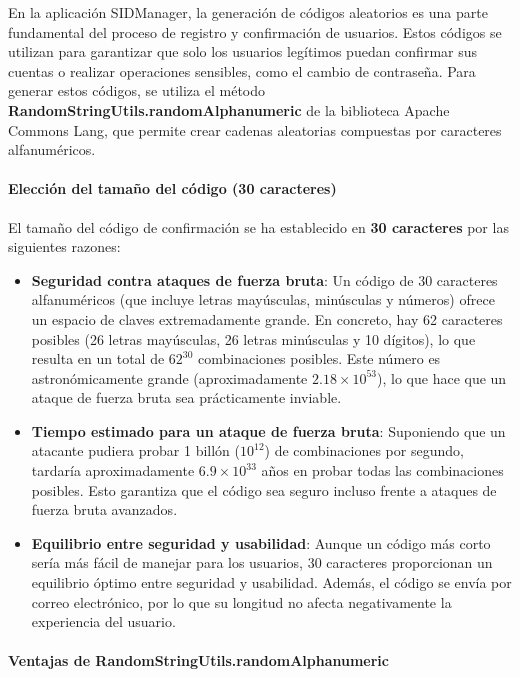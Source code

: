 \documentclass[draft]{scrbook}
\begin{document}
En la aplicación SIDManager, la generación de códigos aleatorios es una parte fundamental del proceso de registro y confirmación de usuarios. Estos códigos se utilizan para garantizar que solo los usuarios legítimos puedan confirmar sus cuentas o realizar operaciones sensibles, como el cambio de contraseña. Para generar estos códigos, se utiliza el método \textbf{RandomStringUtils.randomAlphanumeric} de la biblioteca Apache Commons Lang, que permite crear cadenas aleatorias compuestas por caracteres alfanuméricos.

\paragraph{Elección del tamaño del código (30 caracteres)}

El tamaño del código de confirmación se ha establecido en \textbf{30 caracteres} por las siguientes razones:

\begin{itemize}
    \item \textbf{Seguridad contra ataques de fuerza bruta}: Un código de 30 caracteres alfanuméricos (que incluye letras mayúsculas, minúsculas y números) ofrece un espacio de claves extremadamente grande. En concreto, hay 62 caracteres posibles (26 letras mayúsculas, 26 letras minúsculas y 10 dígitos), lo que resulta en un total de \(62^{30}\) combinaciones posibles. Este número es astronómicamente grande (aproximadamente \(2.18 \times 10^{53}\)), lo que hace que un ataque de fuerza bruta sea prácticamente inviable.
    
    \item \textbf{Tiempo estimado para un ataque de fuerza bruta}: Suponiendo que un atacante pudiera probar 1 billón (\(10^{12}\)) de combinaciones por segundo, tardaría aproximadamente \(6.9 \times 10^{33}\) años en probar todas las combinaciones posibles. Esto garantiza que el código sea seguro incluso frente a ataques de fuerza bruta avanzados.
    
    \item \textbf{Equilibrio entre seguridad y usabilidad}: Aunque un código más corto sería más fácil de manejar para los usuarios, 30 caracteres proporcionan un equilibrio óptimo entre seguridad y usabilidad. Además, el código se envía por correo electrónico, por lo que su longitud no afecta negativamente la experiencia del usuario.
\end{itemize}

\paragraph{Ventajas de RandomStringUtils.randomAlphanumeric}
\end{document}

